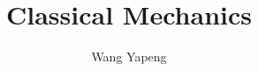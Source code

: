 \documentclass[a4paper]{book}%
\begin{document}
\title{Classical Mechanics}
\author{Wang Yapeng}

\maketitle
\frontmatter


\mainmatter
\tableofcontents



% 

\appendix

\printglossaries
{}

\backmatter 
\end{document}
